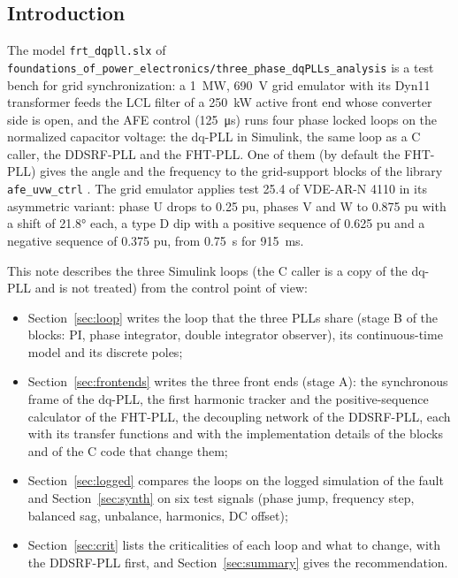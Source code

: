 \documentclass[11pt,a4paper]{scrartcl}
\newcommand{\code}[1]{\texttt{#1}}
\newcommand{\us}{\_\allowbreak}  %
\begin{document}
\begin{onehalfspace}
\section{Introduction}
\label{sec:intro}

The model \code{frt\_dqpll.slx} of \code{foundations\us of\us power\us electronics/\allowbreak three\us phase\us dqPLLs\us analysis} \cite{model_repo} is a test bench for grid synchronization: a \SI{1}{\mega\watt}, \SI{690}{\volt} grid emulator with its Dyn11 transformer feeds the LCL filter of a \SI{250}{\kilo\watt} active front end whose converter side is open, and the AFE control (\SI{125}{\micro\second}) runs four phase locked loops on the normalized capacitor voltage: the dq-PLL in Simulink, the same loop as a C caller, the DDSRF-PLL and the FHT-PLL. One of them (by default the FHT-PLL) gives the angle and the frequency to the grid-support blocks of the library \code{afe\_uvw\_ctrl} \cite{library_repo, note_uvw}. The grid emulator applies test 25.4 of VDE-AR-N 4110 \cite{vde4110} in its asymmetric variant: phase U drops to \num{0.25} pu, phases V and W to \num{0.875} pu with a shift of \ang{21.8} each, a type D dip with a positive sequence of \num{0.625} pu and a negative sequence of \num{0.375} pu, from \SI{0.75}{\second} for \SI{915}{\milli\second}.

This note describes the three Simulink loops (the C caller is a copy of the dq-PLL and is not treated) from the control point of view:
\begin{itemize}[nosep]
	\item Section~\ref{sec:loop} writes the loop that the three PLLs share (stage B of the blocks: PI, phase integrator, double integrator observer), its continuous-time model and its discrete poles;
	\item Section~\ref{sec:frontends} writes the three front ends (stage A): the synchronous frame of the dq-PLL, the first harmonic tracker and the positive-sequence calculator of the FHT-PLL, the decoupling network of the DDSRF-PLL, each with its transfer functions and with the implementation details of the blocks and of the C code that change them;
	\item Section~\ref{sec:logged} compares the loops on the logged simulation of the fault and Section~\ref{sec:synth} on six test signals (phase jump, frequency step, balanced sag, unbalance, harmonics, DC offset);
	\item Section~\ref{sec:crit} lists the criticalities of each loop and what to change, with the DDSRF-PLL first, and Section~\ref{sec:summary} gives the recommendation.
\end{itemize}


\end{onehalfspace}
\end{document}

